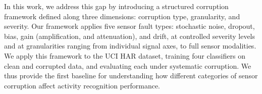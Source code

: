 In this work, we address this gap by introducing a structured corruption framework defined along
three dimensions: corruption type, granularity, and severity. Our framework applies five sensor
fault types: stochastic noise, dropout, bias, gain (amplification, and attenuation), and drift, at
controlled severity levels and at granularities ranging from individual signal axes, to full sensor
modalities. We apply this framework to the UCI HAR dataset, training four classifiers on clean and
corrupted data, and evaluating each under systematic corruption. We thus provide the first baseline
for understanding how different categories of sensor corruption affect activity recognition
performance.
